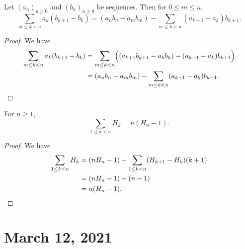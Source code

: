 \documentclass[11pt]{article}
\begin{document}
\begin{theorem}
  Let $(a_n)_{n \geq 0}$ and $(b_n)_{n \geq 0}$ be sequences.
  Then for $0 \leq m \leq n$,
  \begin{equation*}
    \sum_{m \leq k < n} a_k(b_{k+1} - b_k) = (a_nb_n - a_mb_m) - \sum_{m \leq k < n} (a_{k+1}- a_k)b_{k+1}.
  \end{equation*}
\end{theorem}
\begin{proof}
  We have
  \begin{align*}
    \sum_{m \leq k < n} a_k(b_{k+1} - b_k)
    &= \sum_{m \leq k < n} \Bigl((a_{k+1}b_{k+1} - a_kb_k) - (a_{k+1} - a_k)b_{k+1}\Bigr) \\
    &= (a_nb_n - a_mb_m) - \sum_{m \leq k < n} (a_{k+1} - a_k)b_{k+1}.
    \qedhere
  \end{align*}
\end{proof}

\begin{corollary}
  For $n \geq 1$,
  \begin{equation*}
    \sum_{1 \leq k < n} H_k = n(H_n - 1).
  \end{equation*}
\end{corollary}
\begin{proof}
  We have
  \begin{align*}
    \sum_{1 \leq k < n} H_k
    &= (nH_n - 1) - \sum_{1 \leq k < n} (H_{k+1} - H_k)(k+1) \\
    &= (nH_n - 1) - (n - 1) \\
    &= n(H_n - 1).
    \qedhere
  \end{align*}
\end{proof}

\section{March 12, 2021}
\end{document}
